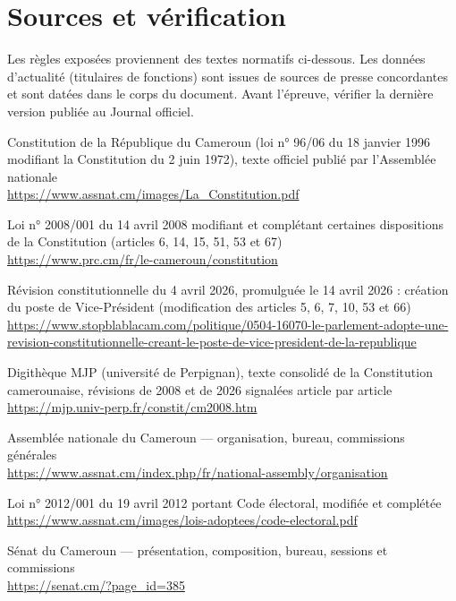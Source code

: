 \documentclass[11pt,a4paper,oneside]{report}
\begin{document}
\chapter{Sources et vérification}
Les règles exposées proviennent des textes normatifs ci-dessous. Les données d'actualité (titulaires de fonctions) sont issues de sources de presse concordantes et sont datées dans le corps du document. Avant l'épreuve, vérifier la dernière version publiée au Journal officiel.

\begin{description}[style=nextline,leftmargin=1.3cm,labelwidth=1cm]
  \item[S1] Constitution de la République du Cameroun (loi n° 96/06 du 18 janvier 1996 modifiant la Constitution du 2 juin 1972), texte officiel publié par l'Assemblée nationale \\ \url{https://www.assnat.cm/images/La_Constitution.pdf}
  \item[S2] Loi n° 2008/001 du 14 avril 2008 modifiant et complétant certaines dispositions de la Constitution (articles 6, 14, 15, 51, 53 et 67) \\ \url{https://www.prc.cm/fr/le-cameroun/constitution}
  \item[S3] Révision constitutionnelle du 4 avril 2026, promulguée le 14 avril 2026 : création du poste de Vice-Président (modification des articles 5, 6, 7, 10, 53 et 66) \\ \url{https://www.stopblablacam.com/politique/0504-16070-le-parlement-adopte-une-revision-constitutionnelle-creant-le-poste-de-vice-president-de-la-republique}
  \item[S4] Digithèque MJP (université de Perpignan), texte consolidé de la Constitution camerounaise, révisions de 2008 et de 2026 signalées article par article \\ \url{https://mjp.univ-perp.fr/constit/cm2008.htm}
  \item[S5] Assemblée nationale du Cameroun — organisation, bureau, commissions générales \\ \url{https://www.assnat.cm/index.php/fr/national-assembly/organisation}
  \item[S6] Loi n° 2012/001 du 19 avril 2012 portant Code électoral, modifiée et complétée \\ \url{https://www.assnat.cm/images/lois-adoptees/code-electoral.pdf}
  \item[S7] Sénat du Cameroun — présentation, composition, bureau, sessions et commissions \\ \url{https://senat.cm/?page_id=385}

\end{description}
\end{document}
